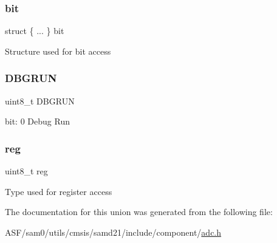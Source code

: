 \subsubsection{\texorpdfstring{bit}{bit}}
{\footnotesize\ttfamily struct \{ ... \}   bit}

Structure used for bit access \mbox{\label{union_a_d_c___d_b_g_c_t_r_l___type_a1e1cc79f6834369b9dd0c6676a0d8781}} 
\subsubsection{\texorpdfstring{DBGRUN}{DBGRUN}}
{\footnotesize\ttfamily uint8\+\_\+t D\+B\+G\+R\+UN}

bit\+: 0 Debug Run \mbox{\label{union_a_d_c___d_b_g_c_t_r_l___type_a9428adc9af4653a2050e2536b55dec8d}} 
\subsubsection{\texorpdfstring{reg}{reg}}
{\footnotesize\ttfamily uint8\+\_\+t reg}

Type used for register access 

The documentation for this union was generated from the following file\+:\begin{DoxyCompactItemize}
\item 
A\+S\+F/sam0/utils/cmsis/samd21/include/component/\mbox{\hyperlink{component_2adc_8h}{adc.\+h}}\end{DoxyCompactItemize}
